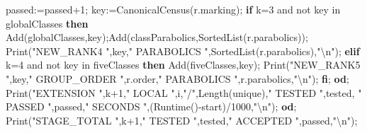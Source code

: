 \documentclass[
  10pt,
  letterpaper,
]{article}
\newenvironment{Shaded}{}{}
\newcommand{\BuiltInTok}[1]{\textcolor[rgb]{0.00,0.50,0.00}{#1}}
\newcommand{\ConstantTok}[1]{\textcolor[rgb]{0.53,0.00,0.00}{#1}}
\newcommand{\ControlFlowTok}[1]{\textcolor[rgb]{0.00,0.44,0.13}{\textbf{#1}}}
\newcommand{\ExtensionTok}[1]{#1}
\newcommand{\FloatTok}[1]{\textcolor[rgb]{0.25,0.63,0.44}{#1}}
\newcommand{\NormalTok}[1]{#1}
\newcommand{\OperatorTok}[1]{\textcolor[rgb]{0.40,0.40,0.40}{#1}}
\newcommand{\StringTok}[1]{\textcolor[rgb]{0.25,0.44,0.63}{#1}}
\newcommand{\VariableTok}[1]{\textcolor[rgb]{0.10,0.09,0.49}{#1}}
\begin{document}
\begin{Shaded}
\begin{Highlighting}[]
   \VariableTok{passed}\OperatorTok{:=}\VariableTok{passed}\OperatorTok{+}\FloatTok{1}\OperatorTok{;}
   \VariableTok{key}\OperatorTok{:=}\VariableTok{CanonicalCensus}\NormalTok{(}\VariableTok{r}\NormalTok{.}\VariableTok{marking}\NormalTok{)}\OperatorTok{;}
   \ControlFlowTok{if} \VariableTok{k}\OperatorTok{=}\FloatTok{3} \ConstantTok{and} \ConstantTok{not} \VariableTok{key} \ExtensionTok{in} \VariableTok{globalClasses} \ControlFlowTok{then}
    \BuiltInTok{Add}\NormalTok{(}\VariableTok{globalClasses}\OperatorTok{,}\VariableTok{key}\NormalTok{)}\OperatorTok{;}\BuiltInTok{Add}\NormalTok{(}\VariableTok{classParabolics}\OperatorTok{,}\BuiltInTok{SortedList}\NormalTok{(}\VariableTok{r}\NormalTok{.}\VariableTok{parabolics}\NormalTok{))}\OperatorTok{;}
    \BuiltInTok{Print}\NormalTok{(}\StringTok{"NEW\_RANK4 "}\OperatorTok{,}\VariableTok{key}\OperatorTok{,}\StringTok{" PARABOLICS "}\OperatorTok{,}\BuiltInTok{SortedList}\NormalTok{(}\VariableTok{r}\NormalTok{.}\VariableTok{parabolics}\NormalTok{)}\OperatorTok{,}\StringTok{"\textbackslash{}n"}\NormalTok{)}\OperatorTok{;}
   \ControlFlowTok{elif} \VariableTok{k}\OperatorTok{=}\FloatTok{4} \ConstantTok{and} \ConstantTok{not} \VariableTok{key} \ExtensionTok{in} \VariableTok{fiveClasses} \ControlFlowTok{then}
    \BuiltInTok{Add}\NormalTok{(}\VariableTok{fiveClasses}\OperatorTok{,}\VariableTok{key}\NormalTok{)}\OperatorTok{;}
    \BuiltInTok{Print}\NormalTok{(}\StringTok{"NEW\_RANK5 "}\OperatorTok{,}\VariableTok{key}\OperatorTok{,}\StringTok{" GROUP\_ORDER "}\OperatorTok{,}\VariableTok{r}\NormalTok{.}\VariableTok{order}\OperatorTok{,}\StringTok{" PARABOLICS "}\OperatorTok{,}\VariableTok{r}\NormalTok{.}\VariableTok{parabolics}\OperatorTok{,}\StringTok{"\textbackslash{}n"}\NormalTok{)}\OperatorTok{;}
   \ControlFlowTok{fi}\OperatorTok{;}
  \ControlFlowTok{od}\OperatorTok{;}
  \BuiltInTok{Print}\NormalTok{(}\StringTok{"EXTENSION "}\OperatorTok{,}\VariableTok{k}\OperatorTok{+}\FloatTok{1}\OperatorTok{,}\StringTok{" LOCAL "}\OperatorTok{,}\VariableTok{i}\OperatorTok{,}\StringTok{"/"}\OperatorTok{,}\BuiltInTok{Length}\NormalTok{(}\VariableTok{unique}\NormalTok{)}\OperatorTok{,}\StringTok{" TESTED "}\OperatorTok{,}\VariableTok{tested}\OperatorTok{,}
   \StringTok{" PASSED "}\OperatorTok{,}\VariableTok{passed}\OperatorTok{,}\StringTok{" SECONDS "}\OperatorTok{,}\NormalTok{(}\BuiltInTok{Runtime}\NormalTok{()}\OperatorTok{{-}}\VariableTok{start}\NormalTok{)}\OperatorTok{/}\FloatTok{1000}\OperatorTok{,}\StringTok{"\textbackslash{}n"}\NormalTok{)}\OperatorTok{;}
 \ControlFlowTok{od}\OperatorTok{;}
 \BuiltInTok{Print}\NormalTok{(}\StringTok{"STAGE\_TOTAL "}\OperatorTok{,}\VariableTok{k}\OperatorTok{+}\FloatTok{1}\OperatorTok{,}\StringTok{" TESTED "}\OperatorTok{,}\VariableTok{tested}\OperatorTok{,}\StringTok{" ACCEPTED "}\OperatorTok{,}\VariableTok{passed}\OperatorTok{,}\StringTok{"\textbackslash{}n"}\NormalTok{)}\OperatorTok{;}

\end{Highlighting}
\end{Shaded}
\end{document}

